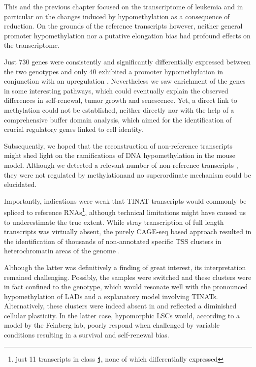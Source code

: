 This and the previous chapter focused on the transcriptome of \mllafnine leukemia and in particular on the changes induced by hypomethylation as a consequence of  reduction. On the grounds of the reference transcripts however, neither general promoter hypomethylation nor a putative elongation bias had profound effects on the transcriptome. 

Just \num{730} genes were consistently and significantly differentially expressed between the two genotypes and only \num{40} exhibited a promoter hypomethylation in conjunction with an upregulation . Nevertheless we saw enrichment of the genes in some interesting pathways, which could eventually explain the observed differences in self-renewal, tumor growth and senescence. Yet, a direct link to methylation could not be established, neither directly nor with the help of a comprehensive buffer domain analysis, which aimed for the identification of crucial regulatory genes linked to cell identity.

Subsequently, we hoped that the reconstruction of non-reference transcripts might shed light on the ramifications of DNA hypomethylation in the \dnmtchip mouse model. Although we detected a relevant number of non-reference transcripts , they were not regulated by methylation\supple and no superordinate mechanism could be elucidated. 

Importantly, indications were weak that TINAT transcripts\cite{Brocks2017} would commonly be spliced to reference RNAs\footnote{just \num{11} transcripts in class \textbf{\texttt{j}}\cite{Pertea2016}, none of which differentially expressed}, although technical limitations might have caused us to underestimate the true extent. While stray transcription of full length transcripts was virtually absent, the purely CAGE-seq based approach resulted in the identification of thousands of non-annotated \dnmtwt specific TSS clusters in heterochromatin areas of the genome .

Although the latter was definitively a finding of great interest, its interpretation remained challenging. Possibly, the samples were switched and these clusters were in fact confined to the \dnmtchip genotype, which would resonate well with the pronounced hypomethylation of LADs and a explanatory model involving TINATs. Alternatively, these clusters were indeed absent in \dnmtchip and reflected a diminished cellular plasticity. In the latter case, hypomorphic \mllafnine LSCs would, according to a model by the Feinberg lab\cite{Pujadas2012}, poorly respond when challenged by variable conditions resulting in a survival and self-renewal bias. 